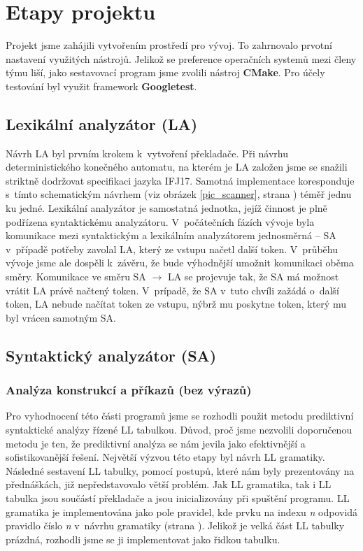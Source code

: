 \documentclass[a4paper,11pt,leqno]{article}
\begin{document}
\section{Etapy projektu}
Projekt jsme zahájili vytvořením prostředí pro vývoj.
To zahrnovalo prvotní nastavení využitých nástrojů.
Jelikož se preference operačních systemů mezi členy týmu liší, jako sestavovací
program jsme zvolili nástroj \textbf{CMake}. Pro účely testování byl využit
framework \textbf{Googletest}.
\subsection{Lexikální analyzátor (LA)}
Návrh LA byl prvním krokem k~vytvoření překladače.
Při návrhu deterministického konečného automatu, na kterém je LA založen jsme se snažili striktně dodržovat specifikaci jazyka IFJ17.
Samotná implementace koresponduje s~tímto schematickým návrhem (viz obrázek \ref{pic_scanner}, strana \pageref{pic_scanner}) téměř jednu ku jedné.
Lexikální analyzátor je samostatná jednotka, jejíž činnost je plně podřízena syntaktickému analyzátoru.
V~počátečních fázích vývoje byla komunikace mezi syntaktickým a lexikálním analyzátorem
jednosměrná -- SA v~případě potřeby zavolal LA, který ze vstupu načetl další token.
V~průběhu vývoje jsme ale dospěli k~závěru, že bude výhodnější umožnit komunikaci oběma směry.
Komunikace ve směru SA $\rightarrow$ LA se projevuje tak, že SA má možnost vrátit LA právě načtený token.
V~prípadě, že SA v~tuto chvíli zažádá o~další token, LA nebude načítat  token ze vstupu, nýbrž mu poskytne  token, který mu byl vrácen samotným SA.
\subsection{Syntaktický analyzátor (SA)}
\subsubsection{Analýza konstrukcí a příkazů (bez výrazů)}
Pro vyhodnocení této části programů jsme se rozhodli použit metodu prediktivní syntaktické analýzy řízené LL tabulkou.
Důvod, proč jsme nezvolili doporučenou metodu je ten, že prediktivní analýza se nám jevila jako efektivnější a sofistikovanější řešení.
Největší výzvou této etapy byl návrh LL gramatiky. Následné sestavení LL tabulky, pomocí postupů, které nám byly prezentovány na přednáškách, již nepředstavovalo větší problém.
Jak LL gramatika, tak i LL tabulka jsou součástí překladače a jsou inicializovány při spuštění programu.
LL gramatika je implementována jako pole pravidel, kde prvku na indexu \emph{n} odpovidá pravidlo číslo \emph{n} v~návrhu gramatiky (strana \pageref{ll_grammar}).
Jelikož je velká část LL tabulky prázdná, rozhodli jsme se ji implementovat jako řidkou tabulku.
\end{document}
